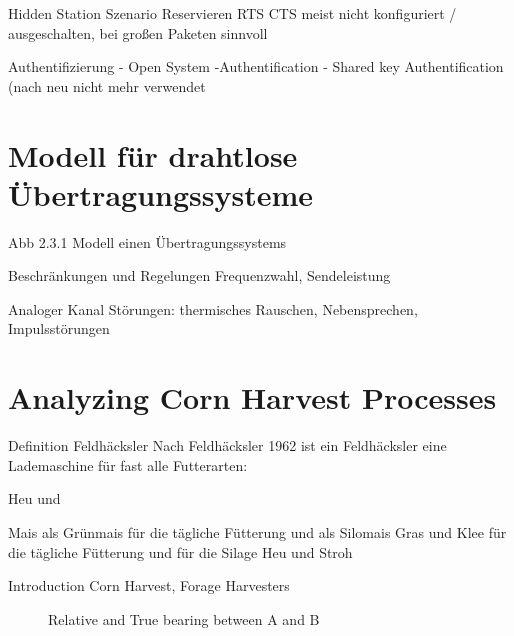\documentclass[]{nsm-thesis}
\begin{document}
Hidden Station Szenario
Reservieren
RTS CTS
meist nicht konfiguriert / ausgeschalten, bei großen Paketen sinnvoll



Authentifizierung
- Open System -Authentification
- Shared key Authentification
(nach neu nicht mehr verwendet





\section{Modell für drahtlose Übertragungssysteme}

Abb 2.3.1  Modell einen Übertragungssystems

Beschränkungen und Regelungen Frequenzwahl, Sendeleistung

Analoger Kanal Störungen: thermisches Rauschen, Nebensprechen, Impulsstörungen



\section{Analyzing Corn Harvest Processes}


Definition Feldhäcksler
Nach Feldhäcksler 1962 ist ein Feldhäcksler eine Lademaschine für fast alle Futterarten:

Heu und

Mais als Grünmais für die tägliche Fütterung und als Silomais
Gras und Klee für die tägliche Fütterung und für die Silage
Heu und Stroh 

Introduction Corn Harvest, Forage Harvesters

\begin{figure}%
	\centering
	\caption{Relative and True bearing between A and B}%
	\label{fig:bearing_fh_tm}%
\end{figure}
\end{document}
